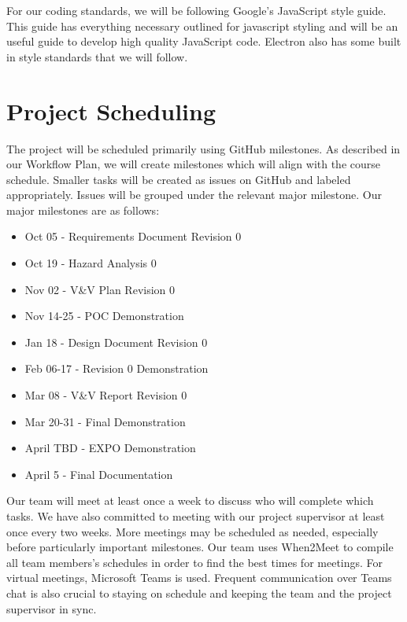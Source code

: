 \documentclass{article}
\begin{document}
For our coding standards, we will be following Google's JavaScript style guide. This guide has everything
necessary outlined for javascript styling and will be an useful guide to develop high quality JavaScript code. Electron also has some built in 
style standards that we will follow.

\section{Project Scheduling}

\noindent The project will be scheduled primarily using GitHub milestones. As described in our Workflow Plan, we will create milestones which will align with the course schedule. Smaller tasks will be created as issues on GitHub and labeled appropriately. Issues will be grouped under the relevant major milestone. Our major milestones are as follows:

\begin{itemize}
  \item Oct 05 - Requirements Document Revision 0
  \item Oct 19 - Hazard Analysis 0 
  \item Nov 02 - V\&V Plan Revision 0
  \item Nov 14-25 - POC Demonstration
  \item Jan 18 - Design Document Revision 0
  \item Feb 06-17 - Revision 0 Demonstration
  \item Mar 08 - V\&V Report Revision 0
  \item Mar 20-31 - Final Demonstration
  \item April TBD - EXPO Demonstration
  \item April 5 - Final Documentation \\
\end{itemize}
\noindent Our team will meet at least once a week to discuss who will complete which tasks. We have also committed to meeting with our project supervisor at least once every two weeks. More meetings may be scheduled as needed, especially before particularly important milestones. Our team uses When2Meet to compile all team members's schedules in order to find the best times for meetings. For virtual meetings, Microsoft Teams is used. Frequent communication over Teams chat is also crucial to staying on schedule and keeping the team and the project supervisor in sync. \\
\end{document}
